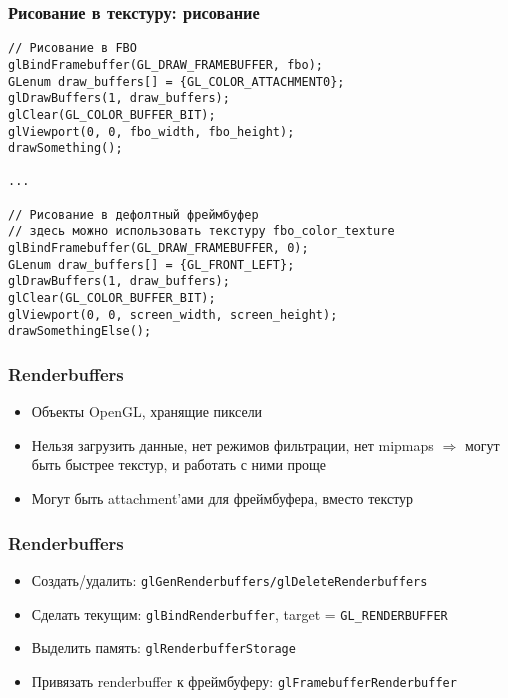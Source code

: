 \documentclass{beamer}
\begin{document}
\begin{frame}[fragile]
\frametitle{Рисование в текстуру: рисование}
\fontsize{8pt}{8pt}
\begin{verbatim}
// Рисование в FBO
glBindFramebuffer(GL_DRAW_FRAMEBUFFER, fbo);
GLenum draw_buffers[] = {GL_COLOR_ATTACHMENT0};
glDrawBuffers(1, draw_buffers);
glClear(GL_COLOR_BUFFER_BIT);
glViewport(0, 0, fbo_width, fbo_height);
drawSomething();

...

// Рисование в дефолтный фреймбуфер
// здесь можно использовать текстуру fbo_color_texture
glBindFramebuffer(GL_DRAW_FRAMEBUFFER, 0);
GLenum draw_buffers[] = {GL_FRONT_LEFT};
glDrawBuffers(1, draw_buffers);
glClear(GL_COLOR_BUFFER_BIT);
glViewport(0, 0, screen_width, screen_height);
drawSomethingElse();
\end{verbatim}
\end{frame}

\begin{frame}[fragile]
\frametitle{Renderbuffers}
\begin{itemize}
\item Объекты OpenGL, хранящие пиксели
\pause
\item Нельзя загрузить данные, нет режимов фильтрации, нет mipmaps \begin{math}\Rightarrow\end{math} могут быть быстрее текстур, и работать с ними проще
\pause
\item Могут быть attachment'ами для фреймбуфера, вместо текстур
\end{itemize}
\end{frame}

\begin{frame}[fragile]
\frametitle{Renderbuffers}
\begin{itemize}
\item Создать/удалить: \verb|glGenRenderbuffers/glDeleteRenderbuffers|
\pause
\item Сделать текущим: \verb|glBindRenderbuffer|, target = \verb|GL_RENDERBUFFER|
\pause
\item Выделить память: \verb|glRenderbufferStorage|
\pause
\item Привязать renderbuffer к фреймбуферу: \verb|glFramebufferRenderbuffer|
\end{itemize}
\end{frame}
\end{document}
